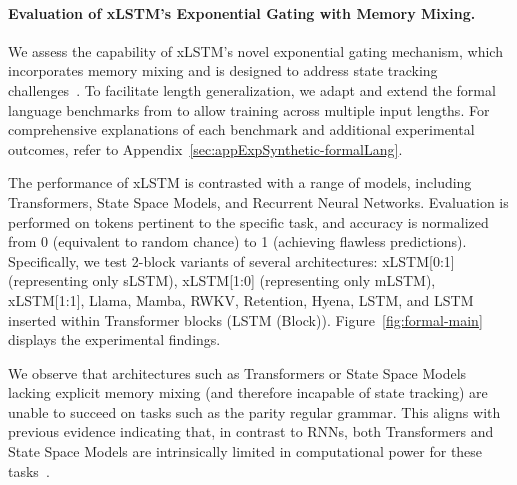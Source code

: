 \paragraph{Evaluation of xLSTM's Exponential Gating with Memory Mixing.} We assess the capability of xLSTM's novel exponential gating mechanism, which incorporates memory mixing and is designed to address state tracking challenges~\citep{Merrill:24, Merrill:23}. To facilitate length generalization, we adapt and extend the formal language benchmarks from \citet{Deletang:23} to allow training across multiple input lengths. For comprehensive explanations of each benchmark and additional experimental outcomes, refer to Appendix~\ref{sec:appExpSynthetic-formalLang}. 

The performance of xLSTM is contrasted with a range of models, including Transformers, State Space Models, and Recurrent Neural Networks. Evaluation is performed on tokens pertinent to the specific task, and accuracy is normalized from 0 (equivalent to random chance) to 1 (achieving flawless predictions). Specifically, we test 2-block variants of several architectures: xLSTM[0:1] (representing only sLSTM), xLSTM[1:0] (representing only mLSTM), xLSTM[1:1], Llama, Mamba, RWKV, Retention, Hyena, LSTM, and LSTM inserted within Transformer blocks (LSTM (Block)). Figure~\ref{fig:formal-main} displays the experimental findings.

We observe that architectures such as Transformers or State Space Models lacking explicit memory mixing (and therefore incapable of state tracking) are unable to succeed on tasks such as the parity regular grammar. This aligns with previous evidence indicating that, in contrast to RNNs, both Transformers and State Space Models are intrinsically limited in computational power for these tasks~\citep{Merrill:24, Merrill:23, Deletang:23}.

